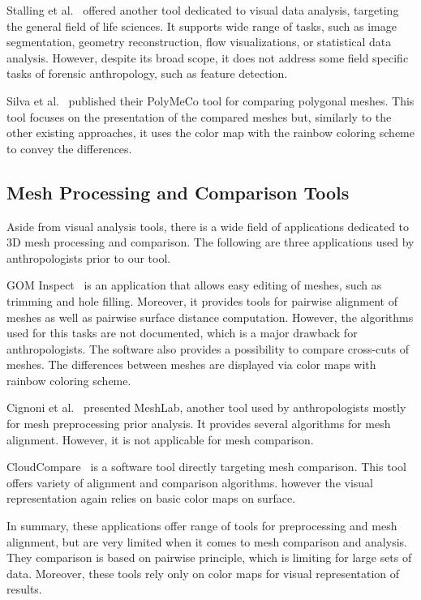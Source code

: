 \documentclass[final,5p,times]{elsarticle}
\begin{document}
Stalling et al.~\cite{stalling200538} offered another tool dedicated to visual data analysis, targeting the general field of life sciences. 
It supports wide range of tasks, such as image segmentation, geometry reconstruction, flow visualizations, or statistical data analysis.
However, despite its broad scope, it does not address some field specific tasks of forensic anthropology, such as feature detection.

Silva et al.~\cite{Silva2005} published their PolyMeCo tool for comparing polygonal meshes. 
This tool focuses on the presentation of the compared meshes but, similarly to the other existing approaches, it uses the color map with the rainbow coloring scheme to convey the differences.

\subsection{Mesh Processing and Comparison Tools}
Aside from visual analysis tools, there is a wide field of applications dedicated to 3D mesh processing and comparison.
The following are three applications used by anthropologists prior to our tool.

GOM Inspect~\cite{GOMInsp} is an application that allows easy editing of meshes, such as trimming and hole filling. Moreover, it provides tools for pairwise alignment of meshes as well as pairwise surface distance computation. 
However, the algorithms used for this tasks are not documented, which is a major drawback for anthropologists. 
The software also provides a possibility to compare cross-cuts of meshes. 
The differences between meshes are displayed via color maps with rainbow coloring scheme.

Cignoni et al.~\cite{meshlab} presented MeshLab, another tool used by anthropologists mostly for mesh preprocessing prior analysis. 
It provides several algorithms for mesh alignment. However, it is not applicable for mesh comparison.

CloudCompare~\cite{CCompare} is a software tool directly targeting mesh comparison. 
This tool offers variety of alignment and comparison algorithms. however the visual representation again relies on basic color maps on surface.

In summary, these applications offer range of tools for preprocessing and mesh alignment, but are very limited when it comes to mesh comparison and analysis. 
They comparison is based on pairwise principle, which is limiting for large sets of data. 
Moreover, these tools rely only on color maps for visual representation of results.
\end{document}
